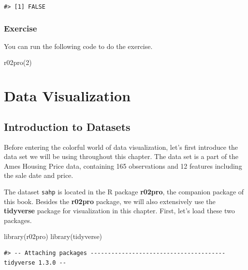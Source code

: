 \documentclass[
]{book}
\newenvironment{Shaded}{\begin{snugshade}}{\end{snugshade}}
\newcommand{\DecValTok}[1]{\textcolor[rgb]{0.00,0.00,0.81}{#1}}
\newcommand{\FunctionTok}[1]{\textcolor[rgb]{0.00,0.00,0.00}{#1}}
\newcommand{\NormalTok}[1]{#1}
\begin{document}
\begin{verbatim}
#> [1] FALSE
\end{verbatim}

\hypertarget{exercise-7}{%
\subsection{Exercise}\label{exercise-7}}

You can run the following code to do the exercise.

\begin{Shaded}
\begin{Highlighting}[]
\FunctionTok{r02pro}\NormalTok{(}\DecValTok{2}\NormalTok{)}
\end{Highlighting}
\end{Shaded}

\hypertarget{data-visualization}{%
\chapter{Data Visualization}\label{data-visualization}}

\hypertarget{intro-dataset}{%
\section{Introduction to Datasets}\label{intro-dataset}}

Before entering the colorful world of data visualization, let's first introduce the data set we will be using throughout this chapter. The data set is a part of the Ames Housing Price data, containing 165 observations and 12 features including the sale date and price.

The dataset \texttt{sahp} is located in the R package \textbf{r02pro}, the companion package of this book.
Besides the \textbf{r02pro} package, we will also extensively use the \textbf{tidyverse} package for visualization in this chapter.
First, let's load these two packages.

\begin{Shaded}
\begin{Highlighting}[]
\FunctionTok{library}\NormalTok{(r02pro)}
\FunctionTok{library}\NormalTok{(tidyverse)}
\end{Highlighting}
\end{Shaded}

\begin{verbatim}
#> -- Attaching packages --------------------------------------- tidyverse 1.3.0 --
\end{verbatim}
\end{document}

